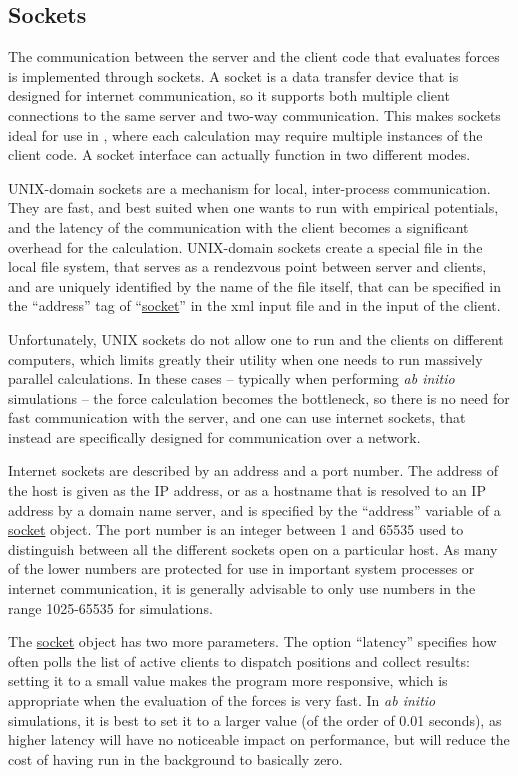 \documentclass[11pt,english,fleqn]{report}
\begin{document}
\subsection{Sockets} \label{sockets}

The communication between the \ipi server and the client code that
evaluates forces is implemented through sockets. A socket is a 
data transfer device that is designed for internet communication,
so it supports both multiple client connections to the same server and
two-way communication. This makes sockets ideal for use in \ipi,
where each calculation may require multiple instances of the client code. 
A socket interface can actually function in two different modes.

UNIX-domain sockets are a mechanism for local, inter-process
communication. They are fast, and best suited when one wants
to run \ipi  with empirical potentials, and the latency of the 
communication with the client becomes a significant overhead
for the calculation. UNIX-domain sockets create a special file
in the local file system, that serves as a rendezvous point
between server and clients, and are uniquely identified by the
name of the file itself, that can be specified in the ``address'' tag of 
``\hyperref[SOCKET]{socket}'' in the xml input file and in 
the input of the client.

Unfortunately, UNIX sockets do not allow one to run \ipi{} and 
the clients on different computers, which limits greatly their 
utility when  one needs to run massively parallel calculations. 
In these cases -- typically when performing \emph{ab initio} 
simulations -- the force calculation becomes the bottleneck, so there is no
need for fast communication with the server, and one can 
use internet sockets, that instead are specifically designed
for communication over a network.

Internet sockets are described by an address and a port number.
The address of the host is given as the IP address,
or as a hostname that is resolved to an IP address by a domain name server,
and is specified by the {}``address'' variable of a 
\hyperref[SOCKET]{socket} object. 
The port number is an integer between 1 and 65535 used to distinguish
between all the different sockets open on a particular host. As
many of the lower numbers are protected for use in important system
processes or internet communication, it is generally advisable to
only use numbers in the range 1025-65535 for simulations.

The \hyperref[SOCKET]{socket} object has two more parameters.
The option ``latency'' specifies how often \ipi{} polls the list of 
active clients to dispatch positions and collect results:
setting it to a small value makes the program more responsive, 
which is appropriate when the evaluation of the forces is very
fast. In \emph{ab initio} simulations, it is best to set it to 
a larger value (of the order of 0.01 seconds), as higher latency 
will have no noticeable impact on performance, but will reduce 
the cost of having \ipi run in the background to basically zero. 
\end{document}
